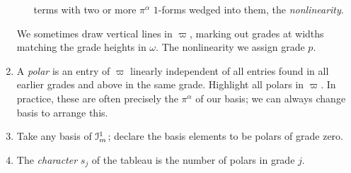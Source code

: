 \begin{enumerate}
\begin{enumerate}
terms with two or more \(\pi^{\alpha}\) \(1\)-forms wedged into them, the \emph{nonlinearity}.
\end{enumerate}
We sometimes draw vertical lines in \(\varpi\), marking out grades at widths matching the grade heights in \(\omega\).
The nonlinearity we assign grade \(p\).
\item
A \emph{polar} is an entry of \(\varpi\) linearly independent of all entries found in all earlier grades and above in the same grade.
Highlight all polars in \(\varpi\).
In practice, these are often precisely the \(\pi^{\alpha}\) of our basis; we can always change basis to arrange this.
\item
Take any basis of \(\mathcal{I}^1_m\); declare the basis elements to be polars of grade zero.
\item
The \emph{character} \(s_j\) of the tableau is the number of polars in grade \(j\).
\end{enumerate}
